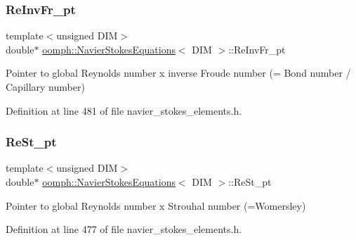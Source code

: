 \subsubsection{\texorpdfstring{Re\+Inv\+Fr\+\_\+pt}{ReInvFr\_pt}}
{\footnotesize\ttfamily template$<$unsigned D\+IM$>$ \\
double$\ast$ \hyperlink{classoomph_1_1NavierStokesEquations}{oomph\+::\+Navier\+Stokes\+Equations}$<$ D\+IM $>$\+::Re\+Inv\+Fr\+\_\+pt\hspace{0.3cm}{\ttfamily [protected]}}



Pointer to global Reynolds number x inverse Froude number (= Bond number / Capillary number) 



Definition at line 481 of file navier\+\_\+stokes\+\_\+elements.\+h.

\mbox{\label{classoomph_1_1NavierStokesEquations_ae60f8d524311d86b8a0ad05d01a01915}} 
\subsubsection{\texorpdfstring{Re\+St\+\_\+pt}{ReSt\_pt}}
{\footnotesize\ttfamily template$<$unsigned D\+IM$>$ \\
double$\ast$ \hyperlink{classoomph_1_1NavierStokesEquations}{oomph\+::\+Navier\+Stokes\+Equations}$<$ D\+IM $>$\+::Re\+St\+\_\+pt\hspace{0.3cm}{\ttfamily [protected]}}



Pointer to global Reynolds number x Strouhal number (=Womersley) 



Definition at line 477 of file navier\+\_\+stokes\+\_\+elements.\+h.

\mbox{\label{classoomph_1_1NavierStokesEquations_a1152c2258c3d19f3ee122be95c1785bd}} 
